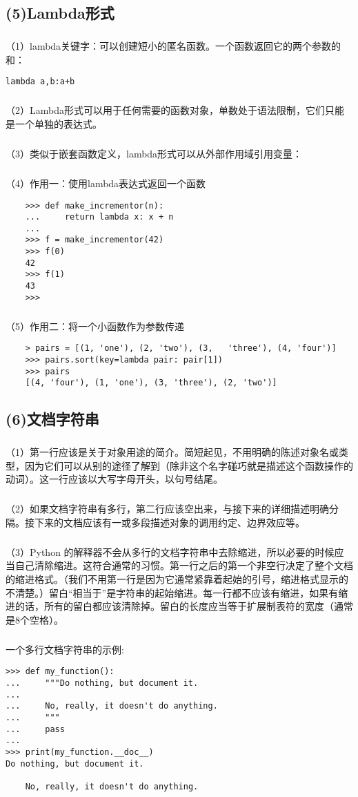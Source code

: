 \documentclass{article}
\begin{document}
\begin{CJK}{UTF8}{gbsn}
\subsection*{(5)Lambda形式}
\subparagraph*{}
（1）lambda关键字：可以创建短小的匿名函数。一个函数返回它的两个参数的和：
\begin{verbatim}
lambda a,b:a+b
\end{verbatim}
\subparagraph*{}
（2）Lambda形式可以用于任何需要的函数对象，单数处于语法限制，它们只能是一个单独的表达式。
\subparagraph*{}
（3）类似于嵌套函数定义，lambda形式可以从外部作用域引用变量：
\subparagraph*{}
（4）作用一：使用lambda表达式返回一个函数
    \begin{verbatim}
    >>> def make_incrementor(n):
    ...     return lambda x: x + n
    ...
    >>> f = make_incrementor(42)
    >>> f(0)
    42
    >>> f(1)
    43
    >>>
    \end{verbatim}
\subparagraph*{}
（5）作用二：将一个小函数作为参数传递
    \begin{verbatim}
    > pairs = [(1, 'one'), (2, 'two'), (3,   'three'), (4, 'four')]
    >>> pairs.sort(key=lambda pair: pair[1])
    >>> pairs
    [(4, 'four'), (1, 'one'), (3, 'three'), (2, 'two')]
\end{verbatim}
\subsection*{(6)文档字符串}
\subparagraph*{}
（1）第一行应该是关于对象用途的简介。简短起见，不用明确的陈述对象名或类型，因为它们可以从别的途径了解到（除非这个名字碰巧就是描述这个函数操作的动词）。这一行应该以大写字母开头，以句号结尾。
\subparagraph*{}
（2）如果文档字符串有多行，第二行应该空出来，与接下来的详细描述明确分隔。接下来的文档应该有一或多段描述对象的调用约定、边界效应等。
\subparagraph*{}
（3）Python 的解释器不会从多行的文档字符串中去除缩进，所以必要的时候应当自己清除缩进。这符合通常的习惯。第一行之后的第一个非空行决定了整个文档的缩进格式。（我们不用第一行是因为它通常紧靠着起始的引号，缩进格式显示的不清楚。）留白“相当于”是字符串的起始缩进。每一行都不应该有缩进，如果有缩进的话，所有的留白都应该清除掉。留白的长度应当等于扩展制表符的宽度（通常是8个空格）。
\subparagraph*{}
一个多行文档字符串的示例:
\begin{verbatim}
>>> def my_function():
...     """Do nothing, but document it.
...
...     No, really, it doesn't do anything.
...     """
...     pass
...
>>> print(my_function.__doc__)
Do nothing, but document it.

    No, really, it doesn't do anything.
\end{verbatim}

\end{CJK}
\end{document}
